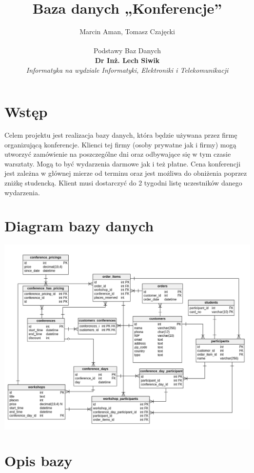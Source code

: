 \documentclass[12pt]{article}
\title{Baza danych „Konferencje”}
\author
{\Large{Marcin Aman, Tomasz Czajęcki}\\
\\
\large{Podstawy Baz Danych}\\
\normalsize{\bf Dr Inż. Lech Siwik}\\
\normalsize{\it Informatyka na wydziale Informatyki, Elektroniki i Telekomunikacji}\\
}
\begin{document}
\maketitle

\newpage

\section{Wstęp}
Celem projektu jest realizacja bazy danych, która będzie używana przez firmę organizującą konferencje. Klienci tej firmy (osoby prywatne jak i firmy) mogą utworzyć zamówienie na poszczególne dni oraz odbywające się w tym czasie warsztaty. Mogą to być wydarzenia darmowe jak i też płatne. Cena konferencji jest zależna w głównej mierze od terminu oraz jest możliwa do obniżenia poprzez zniżkę studencką. Klient musi dostarczyć do 2 tygodni listę uczestników danego wydarzenia.
\section{Diagram bazy danych}
\includegraphics[width=\textwidth]{ConferenceSchema.png}
\section{Opis bazy}
\end{document}
